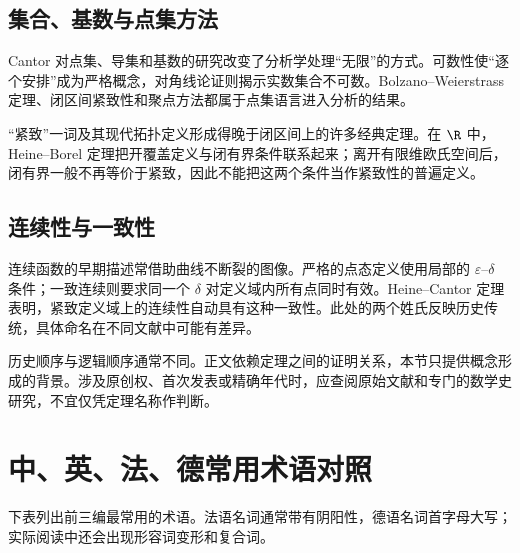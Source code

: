 \subsection*{集合、基数与点集方法}

Cantor 对点集、导集和基数的研究改变了分析学处理“无限”的方式。可数性使“逐个安排”成为严格概念，对角线论证则揭示实数集合不可数。Bolzano--Weierstrass 定理、闭区间紧致性和聚点方法都属于点集语言进入分析的结果。

“紧致”一词及其现代拓扑定义形成得晚于闭区间上的许多经典定理。在 $\R$ 中，Heine--Borel 定理把开覆盖定义与闭有界条件联系起来；离开有限维欧氏空间后，闭有界一般不再等价于紧致，因此不能把这两个条件当作紧致性的普遍定义。

\subsection*{连续性与一致性}

连续函数的早期描述常借助曲线不断裂的图像。严格的点态定义使用局部的 $\varepsilon$--$\delta$ 条件；一致连续则要求同一个 $\delta$ 对定义域内所有点同时有效。Heine--Cantor 定理表明，紧致定义域上的连续性自动具有这种一致性。此处的两个姓氏反映历史传统，具体命名在不同文献中可能有差异。

\begin{remark}[历史注记的使用边界]
历史顺序与逻辑顺序通常不同。正文依赖定理之间的证明关系，本节只提供概念形成的背景。涉及原创权、首次发表或精确年代时，应查阅原始文献和专门的数学史研究，不宜仅凭定理名称作判断。
\end{remark}

\section{中、英、法、德常用术语对照}

下表列出前三编最常用的术语。法语名词通常带有阴阳性，德语名词首字母大写；实际阅读中还会出现形容词变形和复合词。

